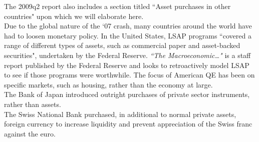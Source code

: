 \documentclass[notitlepage,12pt]{report}
\begin{document}
The 2009q2 report also includes a section titled ``Asset purchases in other countries"\cite[p.92]{noauthor_quantitative_nodate} upon which we will elaborate here.\\

Due to the global nature of the `07 crash, many countries around the world have had to loosen monetary policy. In the United States, LSAP programs ``covered a range of different types of assets, such as commercial paper and asset-backed securities"\cite[p.92]{noauthor_quantitative_nodate}, undertaken by the Federal Reserve. {\it ``The Macroeconomic\dots"}\cite{chen_macroeconomic_2011} is a staff report published by the Federal Reserve and looks to retroactively model LSAP to see if those programs were worthwhile. The focus of American QE has been on specific markets, such as housing, rather than the economy at large.\\

The Bank of Japan introduced outright purchases of private sector instruments, rather than assets.\\

The Swiss National Bank purchased, in additional to normal private assets, foreign currency to increase liquidity and prevent appreciation of the Swiss franc against the euro.

\begin{comment}

\section{Unofficial Statement from Tucker}

The author emailed Sir Paul Tucker, who is at time of writing a professor at Harvard, about his decisions to introduce LSAP programs to the UK. The email contained the following noteworthy comments.

\begin{quote}
	\(\bullet\) I think some of the substance is in speeches by Mervyn King [Governor], Charlie Bean [Chief Economist] and others, including myself\\
	
	{\it Did your training in mathematics influence your decision to begin QE in Britain?}\\
	\(\bullet\) No, or only in so far as it made it easier than otherwise to train in economics\\
	
	{\it On the economic model used to optimise amount of assets purchased}\\
	\(\bullet\) Portfolio balance models in conditions of imperfect arbitrage\\
	
	{\it Did you know that you would have to increase asset purchase and underestimate the amount required?}\\
	\(\bullet\) Yes, but not which. The thing about monetary policy is that, unlike many other areas of public policy, you get to reset your instrument every month (now every six weeks). We wanted to do enough to make a material difference. It turned out that we needed to do more.
\end{quote}
\end{comment}
\end{document}
